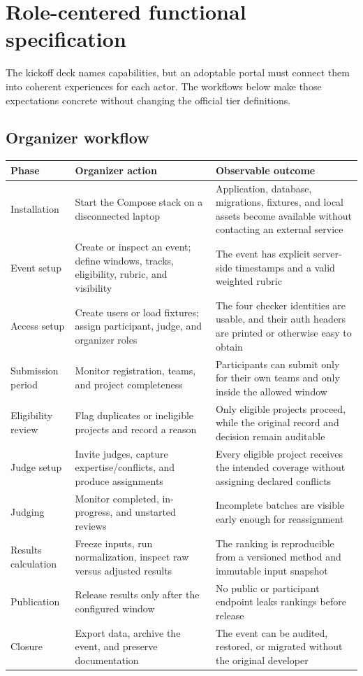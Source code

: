 \section{Role-centered functional specification}

\advisory\par


The kickoff deck names capabilities, but an adoptable portal must connect them into coherent experiences for each actor. The workflows below make those expectations concrete without changing the official tier definitions.

\subsection{Organizer workflow}

\begin{longtable}{@{}L{31mm}L{42mm}L{84mm}@{}}
\toprule
\textbf{Phase} & \textbf{Organizer action} & \textbf{Observable outcome}\\
\midrule
\endhead%
Installation & Start the Compose stack on a disconnected laptop & Application, database, migrations, fixtures, and local assets become available without contacting an external service\\
Event setup & Create or inspect an event; define windows, tracks, eligibility, rubric, and visibility & The event has explicit server-side timestamps and a valid weighted rubric\\
Access setup & Create users or load fixtures; assign participant, judge, and organizer roles & The four checker identities are usable, and their auth headers are printed or otherwise easy to obtain\\
Submission period & Monitor registration, teams, and project completeness & Participants can submit only for their own teams and only inside the allowed window\\
Eligibility review & Flag duplicates or ineligible projects and record a reason & Only eligible projects proceed, while the original record and decision remain auditable\\
Judge setup & Invite judges, capture expertise/conflicts, and produce assignments & Every eligible project receives the intended coverage without assigning declared conflicts\\
Judging & Monitor completed, in-progress, and unstarted reviews & Incomplete batches are visible early enough for reassignment\\
Results calculation & Freeze inputs, run normalization, inspect raw versus adjusted results & The ranking is reproducible from a versioned method and immutable input snapshot\\
Publication & Release results only after the configured window & No public or participant endpoint leaks rankings before release\\
Closure & Export data, archive the event, and preserve documentation & The event can be audited, restored, or migrated without the original developer\\
\bottomrule
\end{longtable}

